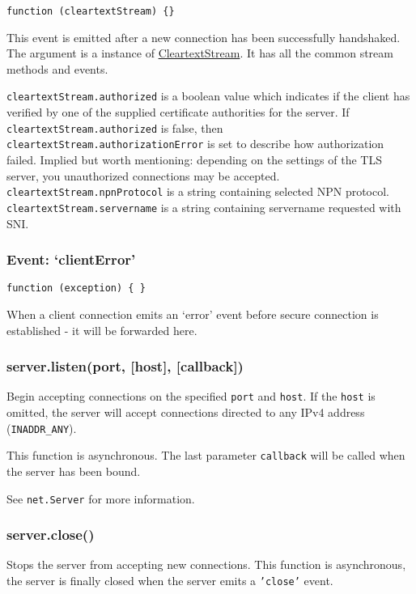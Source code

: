 \texttt{function (cleartextStream) \{\}}

This event is emitted after a new connection has been successfully
handshaked. The argument is a instance of
\hyperref[tls\_class\_tls\_cleartextstream]{CleartextStream}. It has all
the common stream methods and events.

\texttt{cleartextStream.authorized} is a boolean value which indicates
if the client has verified by one of the supplied certificate
authorities for the server. If \texttt{cleartextStream.authorized} is
false, then \texttt{cleartextStream.authorizationError} is set to
describe how authorization failed. Implied but worth mentioning:
depending on the settings of the TLS server, you unauthorized
connections may be accepted. \texttt{cleartextStream.npnProtocol} is a
string containing selected NPN protocol.
\texttt{cleartextStream.servername} is a string containing servername
requested with SNI.

\subsubsection{Event: `clientError'}

\texttt{function (exception) \{ \}}

When a client connection emits an `error' event before secure connection
is established - it will be forwarded here.

\subsubsection{server.listen(port, {[}host{]}, {[}callback{]})}

Begin accepting connections on the specified \texttt{port} and
\texttt{host}. If the \texttt{host} is omitted, the server will accept
connections directed to any IPv4 address (\texttt{INADDR\_ANY}).

This function is asynchronous. The last parameter \texttt{callback} will
be called when the server has been bound.

See \texttt{net.Server} for more information.

\subsubsection{server.close()}

Stops the server from accepting new connections. This function is
asynchronous, the server is finally closed when the server emits a
\texttt{'close'} event.

